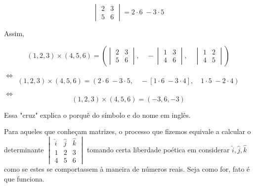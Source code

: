 \[
\begin{vmatrix} 2 & 3 \\ 5 & 6 \end{vmatrix} = 2 \cdot 6\;- 3 \cdot 5
\]

Assim,

\[ (1, 2, 3) \times (4, 5, 6) = 
\left(
\begin{vmatrix} 2 & 3 \\ 5 & 6 \end{vmatrix},\quad
-\begin{vmatrix} 1 & 3 \\ 4 & 6 \end{vmatrix},\quad
\begin{vmatrix} 1 & 2 \\ 4 & 5 \end{vmatrix}
\right)
\]

\(\Longleftrightarrow\) \[ (1, 2, 3) \times (4, 5, 6) = 
\left(
2 \cdot 6\;- 3 \cdot 5,\quad
-[1 \cdot 6\;- 3 \cdot 4],\quad
1 \cdot 5\; - 2 \cdot 4
\right)
\]

\(\Longleftrightarrow\) \[ (1, 2, 3) \times (4, 5, 6) = 
\left(
-3 ,
6,
-3
\right)
\]

Essa "cruz" explica o porquê do símbolo e do nome em inglês.

Para aqueles que conheçam matrizes, o processo que fizemos equivale a calcular o determinante \( \begin{vmatrix} \hat{i} & \hat{j} & \hat{k} \\ 1 & 2 & 3 \\ 4 & 5 & 6 \end{vmatrix} \) tomando certa liberdade poética em considerar \( \hat{i}, \hat{j},\hat{k} \) como se estes se comportassem à maneira de números reais. Seja como for, fato é que funciona.